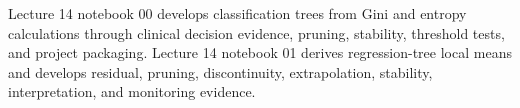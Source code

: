 \begin{notebooklink}
Lecture 14 notebook 00 develops classification trees from Gini and entropy
calculations through clinical decision evidence, pruning, stability, threshold
tests, and project packaging. Lecture 14 notebook 01 derives regression-tree
local means and develops residual, pruning, discontinuity, extrapolation,
stability, interpretation, and monitoring evidence.
\end{notebooklink}
